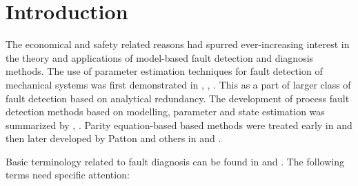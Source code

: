 \chapter{Introduction}
The economical and safety related reasons had spurred ever-increasing interest in the theory and applications of
model-based fault detection and diagnosis methods. The use of parameter estimation techniques for fault detection of
mechanical systems was first demonstrated in \cite{baskiotis1979parameter}, \cite{geiger1982monitoring}
\cite{filbert1982quality}, \cite{hohmann1977automatic}. This as a part of larger class of fault detection based on
analytical redundancy. The development of process fault detection methods based on modelling, parameter and state
estimation was summarized by \cite{isermann1984process}, \cite{isermann1997trends}. Parity equation-based based methods
were treated early in \cite{chow1984analytical} and then later developed by Patton and others in \cite{patton1991review}
and \cite{hofling1994detection}.

Basic terminology related to fault diagnosis can be found in \cite{hofling1994detection} and \cite{ding2005model}. The following terms need specific attention:

